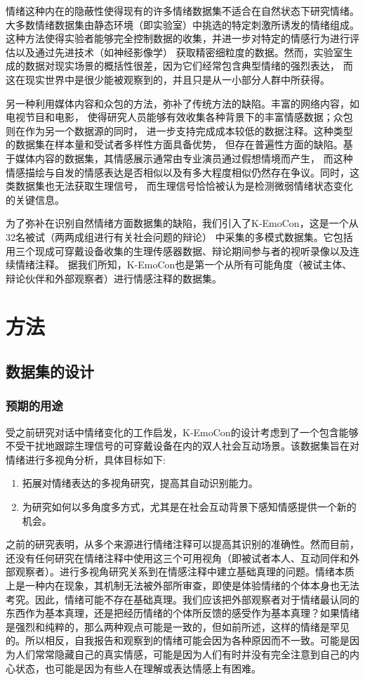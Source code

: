情绪这种内在的隐蔽性使得现有的许多情绪数据集不适合在自然状态下研究情绪。
大多数情绪数据集由静态环境（即实验室）中挑选的特定刺激所诱发的情绪组成。
这种方法使得实验者能够完全控制数据的收集，并进一步对特定的情感行为进行评估以及通过先进技术（如神经影像学）
获取精密细粒度的数据。然而，实验室生成的数据对现实场景的概括性很差，因为它们经常包含典型情绪的强烈表达，
而这在现实世界中是很少能被观察到的，并且只是从一小部分人群中所获得。

另一种利用媒体内容和众包的方法，弥补了传统方法的缺陷。丰富的网络内容，如电视节目和电影，
使得研究人员能够有效收集各种背景下的丰富情感数据；众包则在作为另一个数据源的同时，
进一步支持完成成本较低的数据注释。这种类型的数据集在样本量和受试者多样性方面具备优势，
但存在普遍性方面的缺陷。基于媒体内容的数据集，其情感展示通常由专业演员通过假想情境而产生，
而这种情感描绘与自发的情感表达是否相似以及有多大程度相似仍然存在争议。同时，这类数据集也无法获取生理信号，
而生理信号恰恰被认为是检测微弱情绪状态变化的关键信息。

为了弥补在识别自然情绪方面数据集的缺陷，我们引入了K-EmoCon，这是一个从32名被试（两两成组进行有关社会问题的辩论）
中采集的多模式数据集。它包括用三个现成可穿戴设备收集的生理传感器数据、辩论期间参与者的视听录像以及连续情绪注释。
据我们所知，K-EmoCon也是第一个从所有可能角度（被试主体、辩论伙伴和外部观察者）进行情感注释的数据集。

\section{方法}
\subsection{数据集的设计}
\subsubsection{预期的用途}
受之前研究对话中情绪变化的工作启发，K-EmoCon的设计考虑到了一个包含能够不受干扰地跟踪生理信号的可穿戴设备在内的双人社会互动场景。该数据集旨在对情绪进行多视角分析，具体目标如下:
\begin{enumerate}
    \item 拓展对情绪表达的多视角研究，提高其自动识别能力。
    \item 为研究如何以多角度多方式，尤其是在社会互动背景下感知情感提供一个新的机会。
    \end{enumerate}

之前的研究表明，从多个来源进行情绪注释可以提高其识别的准确性。然而目前，还没有任何研究在情绪注释中使用这三个可用视角（即被试者本人、互动同伴和外部观察者）。进行多视角研究关系到在情感注释中建立基础真理的问题。情绪本质上是一种内在现象，其机制无法被外部所审查，即使是体验情绪的个体本身也无法考究。因此，情绪可能不存在基础真理。我们应该把外部观察者对于情绪最认同的东西作为基本真理，还是把经历情绪的个体所反馈的感受作为基本真理？如果情绪是强烈和纯粹的，那么两种观点可能是一致的，但如前所述，这样的情绪是罕见的。所以相反，自我报告和观察到的情绪可能会因为各种原因而不一致。可能是因为人们常常隐藏自己的真实情感，可能是因为人们有时并没有完全注意到自己的内心状态，也可能是因为有些人在理解或表达情感上有困难。

